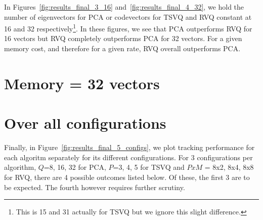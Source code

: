 \begin{Body}
In Figures~\ref{fig:results_final_3_16} and~\ref{fig:results_final_4_32}, we hold the number of eigenvectors for PCA or codevectors for TSVQ and RVQ constant at 16 and 32 respectively\footnote{This is 15 and 31 actually for TSVQ but we ignore this slight difference.}.  In these figures, we see that PCA outperforms RVQ for 16 vectors but RVQ completely outperforms PCA for 32 vectors.  For a given memory cost, and therefore for a given rate, RVQ overall outperforms PCA.  

\section{Memory = 32 vectors}

\section{Over all configurations}

Finally, in Figure~\ref{fig:results_final_5_configs}, we plot tracking performance for each algoritm separately for its different configurations.  For 3 configurations per algorithm, $Q$=8, 16, 32 for PCA, $P$=3, 4, 5 for TSVQ and $PxM$ = 8x2, 8x4, 8x8 for RVQ, there are 4 possible outcomes listed below.  Of these, the first 3 are to be expected.  The fourth however requires further scrutiny.


\end{Body}
